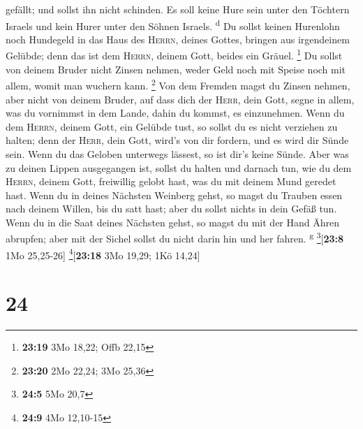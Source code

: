 gefällt; und sollst ihn nicht schinden.  Es soll keine
Hure sein unter den Töchtern Israels und kein Hurer unter den Söhnen
Israels. \textsuperscript{d}  Du sollst keinen Hurenlohn
noch Hundegeld in das Haus des \textsc{Herrn}, deines Gottes, bringen
aus irgendeinem Gelübde; denn das ist dem \textsc{Herrn}, deinem Gott,
beides ein Gräuel. \footnote{\textbf{23:19} 3Mo 18,22; Offb 22,15}
 Du sollst von deinem Bruder nicht Zinsen nehmen, weder
Geld noch mit Speise noch mit allem, womit man wuchern kann. \footnote{\textbf{23:20}
  2Mo 22,24; 3Mo 25,36}  Von dem Fremden magst du Zinsen
nehmen, aber nicht von deinem Bruder, auf dass dich der \textsc{Herr},
dein Gott, segne in allem, was du vornimmst in dem Lande, dahin du
kommst, es einzunehmen.  Wenn du dem \textsc{Herrn},
deinem Gott, ein Gelübde tust, so sollst du es nicht verziehen zu
halten; denn der \textsc{Herr}, dein Gott, wird's von dir fordern, und
es wird dir Sünde sein.  Wenn du das Geloben unterwegs
lässest, so ist dir's keine Sünde.  Aber was zu deinen
Lippen ausgegangen ist, sollst du halten und darnach tun, wie du dem
\textsc{Herrn}, deinem Gott, freiwillig gelobt hast, was du mit deinem
Mund geredet hast.  Wenn du in deines Nächsten Weinberg
gehst, so magst du Trauben essen nach deinem Willen, bis du satt hast;
aber du sollst nichts in dein Gefäß tun.  Wenn du in die
Saat deines Nächsten gehst, so magst du mit der Hand Ähren abrupfen;
aber mit der Sichel sollst du nicht darin hin und her fahren.
\textsuperscript{g} \footnote{\textbf{24:5} 5Mo 20,7}{[}\textbf{23:8}
1Mo 25,25-26{]} \footnote{\textbf{24:9} 4Mo 12,10-15}{[}\textbf{23:18}
3Mo 19,29; 1Kö 14,24{]}

\hypertarget{section-23}{%
\section{24}\label{section-23}}

